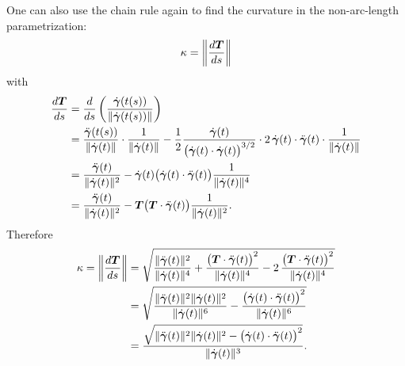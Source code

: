 One can also use the chain rule again to find the curvature in the
non-arc-length parametrization:
\[
  \kappa = \left\lVert \frac{d\bm{T}}{ds} \right\rVert
\]
with
\begin{align*}
  \frac{d\bm{T}}{ds}
  &= \frac{d}{ds} \left( \frac{\dot{\bm{\gamma}}(t(s))}
                              {\lVert \dot{\bm{\gamma}}(t(s)) \rVert} \right) \\
  &= \frac{\ddot{\bm{\gamma}}(t(s))}{\lVert \dot{\bm{\gamma}}(t) \rVert}
     \cdot \frac{1}{\lVert \dot{\bm{\gamma}}(t) \rVert}
   - \frac{1}{2}
     \frac{\dot{\bm{\gamma}}(t)}
          {\bigl(\dot{\bm{\gamma}}(t) \cdot \dot{\bm{\gamma}}(t)\bigr)^{3/2}}
     \cdot 2 \, \dot{\bm{\gamma}}(t) \cdot \ddot{\bm{\gamma}}(t)
     \cdot \frac{1}{\lVert \dot{\bm{\gamma}}(t) \rVert} \\
  &= \frac{\ddot{\bm{\gamma}}(t)}{\lVert \dot{\bm{\gamma}}(t) \rVert^2}
   - \dot{\bm{\gamma}}(t)
     \bigl(\dot{\bm{\gamma}}(t) \cdot \ddot{\bm{\gamma}}(t)\bigr)
     \frac{1}{\lVert \dot{\bm{\gamma}}(t) \rVert^4} \\
  &= \frac{\ddot{\bm{\gamma}}(t)}{\lVert \dot{\bm{\gamma}}(t) \rVert^2}
   - \bm{T} \bigl(\bm{T} \cdot \ddot{\bm{\gamma}}(t)\bigr)
     \frac{1}{\lVert \dot{\bm{\gamma}}(t) \rVert^2} .
\end{align*}
Therefore
\begin{align}
  \kappa = \left\lVert \frac{d\bm{T}}{ds} \right\rVert
  &= \sqrt{ \frac{\lVert \ddot{\bm{\gamma}}(t) \rVert^2}
                 {\lVert \dot{\bm{\gamma}}(t) \rVert^4}
          + \frac{\bigl(\bm{T} \cdot \ddot{\bm{\gamma}}(t)\bigr)^2}
                 {\lVert \dot{\bm{\gamma}}(t) \rVert^4}
          - 2 \, \frac{\bigl(\bm{T} \cdot \ddot{\bm{\gamma}}(t)\bigr)^2}
                      {\lVert \dot{\bm{\gamma}}(t) \rVert^4} }
  \notag \\
  &= \sqrt{ \frac{\lVert \ddot{\bm{\gamma}}(t) \rVert^2
                  \lVert \dot{\bm{\gamma}}(t) \rVert^2}
                 {\lVert \dot{\bm{\gamma}}(t) \rVert^6}
          - \frac{\bigl(\dot{\bm{\gamma}}(t) \cdot \ddot{\bm{\gamma}}(t)\bigr)^2}
                 {\lVert \dot{\bm{\gamma}}(t) \rVert^6} }
  \notag \\
  &= \frac{\sqrt{ \lVert \ddot{\bm{\gamma}}(t) \rVert^2
                  \lVert \dot{\bm{\gamma}}(t) \rVert^2
                - \bigl(\dot{\bm{\gamma}}(t) \cdot \ddot{\bm{\gamma}}(t)\bigr)^2 }}
          {\lVert \dot{\bm{\gamma}}(t) \rVert^3} .
  \label{eq:curvature-general}
\end{align}

